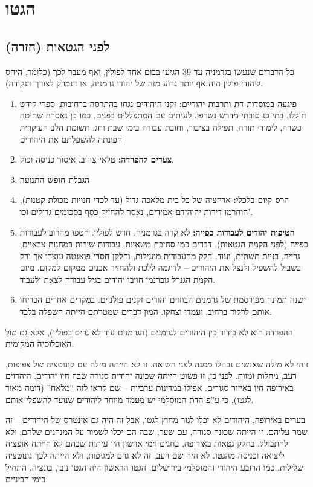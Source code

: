 \documentclass[a4paper]{book}
\begin{document}
	\section{הגטו}
	
	\subsection{לפני הגטאות (חזרה)}
	כל הדברים שנעשו בגרמניה עד 39 הגיעו בבום אחד לפולין, ואף מעבר לכך (כלומר, היחס ליהודי פולין היה אף יותר גרוע מזה של יהודי גרמניה, או דנמרק לצורך הנקודה). 
	\begin{enumerate}
		\item \textbf{פיגעה במוסדות דת ותרבות יהודיים: }זקני היהודים נגחו בהתרסה ברחובות, ספרי קודש חוללו, בתי כנ סובתי מדרש נשרפו, לעיתים עם המתפללים בפנים. כמו כן נאסרה שחיטה כשרה, לימודי תורה, תפילה בציבור, וחובת עבודה בימי שבת וחג. תשומת הלב העיקרית הפונתה להשפלתם את היהודים
		\item \textbf{צעדים להפרדה: }טלאי צהוב, איסור כניסה וכוק. 
		\item \textbf{הגבלת חופש התנועה}
		\item \textbf{הרס קיום כלכלי: }אריזציה של כל בית מלאכה גדול (עד לכדי חנויות מכולת קטנות), הוחרמו דירות יהוהידם אמידים, נאסר להחזיק כסף בסכומים גדולים וכו'. 
		\item \textbf{חטיפות יהודים לעבודות כפייה: }לא קרה בגרמניה. חדש לפולין. חטפו מהרוב לעבודות כפייה (לפני הקמת הגטאות). דברים כמו סחיבת משאיות, עבודות שירות במחנות צבאיים, גרייה, בניית תשתית, ועוד. חלק מהעבודות מועילות, וחלקן חסרי פואנטה ונוצרו אך ורק בשביל להשפיל ולנצל את היהודים – לדוגמה ללכת ולהחזיר אבנים ממקום למקום. מיום הקמת הגנרל גוברנמן חויבו יהודים בגיל עבודה לצאת ולעבוד. 
		\item ישנה תמונה מפורסמת של גרמנים הבוזזים יהודים זקנים פולניים. במקרים אחרים הכריחו אותם לרקוד ברחוב, ועמדו וצחקו. המון דברים שמטרתם הייתה השפלה בלבד. 
	\end{enumerate}
	
	ההפרדה הוא לא בידוד בין היהודים לגרמנים (הגרמנים עוד לא גרים בפולין), אלא גם מול האוכלוסיה המקומית. 
	
	זוהי לא מילה שאנשים נבהלו ממנה לפני השואה. זו לא הייתה מילה עם קונוטציה של צפיפות, רעב, מחלות ומוות. לפני כן, זו פשוט הייתה שכונה יהודית סגורה שבה חיו יהודים. היהדוים באירופה חיו באיזור סגורים. אפילו במדינות ערביות – שם קראו לזה ``מלאח'' (דומה מאוד לגטו), כי ע''פ הדת המוסלמי יש מעמד מיוחד ליהודים שנועד להשפלי אותם. 
	
	בערים באירופה, היהודים לא יכלו לגור מחוץ לגטו, אבל זה היה גם אינטרס של היהודים – זה שמר עליהם. זו הייתה שכונה סגורה, עם שער, שבה הם יכלו לשמור על המנהגים שלהם, ולא להתבולל. בחלק גטאות באירופה, בחגים וימי ארשון היו עיתות שבהם לא הייתה אופציה ליציאה וכניסה מהגטו. לא היה שם רעב, זה לא גרם למגיפות, ולא הייתה לכך גונוטציה שלילית. כמו הרובע היהודי והמוסלמי בירושלים. הגטו הראשון היה הגטו נובו, בונציה. התחיל בימי הביניים. 
	
\end{document}
